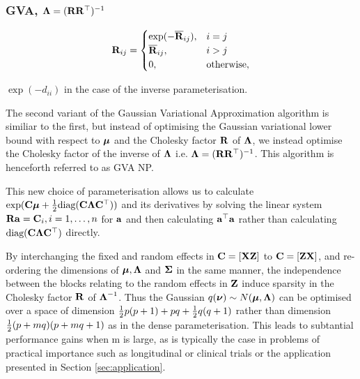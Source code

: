 \documentclass{article}[12pt]
\newcommand{\mgc}[1]{{\color{blue}#1}}
\begin{document}
	\subsubsection{GVA, ${\boldsymbol \Lambda} = ({\bf R} {\bf R}^\top)^{-1}$}
	
	\begin{equation*}
		{\bf R}_{ij} =
		\begin{cases}
			\exp(-\overline{{\bf R}}_{ij}), & i = j             \\
			\overline{{\bf R}}_{ij},        & i > j             \\
			0,                          & \text{otherwise}, 
		\end{cases}
	\end{equation*}
	
	\mgc{$\exp{(-d_{ii})}$ in the case of the inverse parameterisation.}
	
	\noindent The second variant of the Gaussian Variational Approximation algorithm is similiar to the first, but
	instead of optimising the Gaussian variational lower bound with respect to ${\boldsymbol \mu}$ and the Cholesky factor
	${\bf R}$ of ${\boldsymbol \Lambda}$, we instead optimise the Cholesky factor of the inverse of ${\boldsymbol \Lambda}$ i.e. ${\boldsymbol \Lambda} =
	({\bf R} {\bf R}^\top)^{-1}$. This algorithm is henceforth referred to as GVA NP.
	
	\noindent This new choice of parameterisation allows us to calculate $\exp({\bf C} {\boldsymbol \mu} + \tfrac{1}{2} \text{diag}({\bf C}
	{\boldsymbol \Lambda} {\bf C}^\top))$ and its derivatives by solving the linear system ${\bf R} {\bf a} = {\bf C}_{i}, i=1, \ldots, n$ for
	${\bf a}$ and then calculating ${\bf a}^\top{\bf a}$ rather than calculating $\text{diag}({\bf C} {\boldsymbol \Lambda} {\bf C}^\top)$
	directly.
	
	\noindent By interchanging the fixed and random effects in ${\bf C} = [{\bf X} {\bf Z}]$ to ${\bf C} = [{\bf Z} {\bf X}]$, and re-
	ordering the dimensions of ${\boldsymbol \mu}, {\boldsymbol \Lambda}$ and ${\boldsymbol \Sigma}$ in the same manner, the independence between the
	blocks relating to the random effects in ${\bf Z}$ induce sparsity in the Cholesky factor ${\bf R}$ of
	${\boldsymbol \Lambda}^{-1}$. Thus the Gaussian $q({\boldsymbol \nu}) \sim N({\boldsymbol \mu}, {\boldsymbol \Lambda})$ can be optimised over a space of dimension
	$\tfrac{1}{2} p (p + 1) + pq + \tfrac{1}{2} q (q + 1)$ rather than dimension $\tfrac{1}{2} (p + mq) (p + mq + 1)$ as in the dense
	parameterisation. This leads to subtantial performance gains when m is large, as is typically the case in
	problems of practical importance such as longitudinal or clinical trials or the application presented in
	Section \ref{sec:application}.
	
\end{document}
